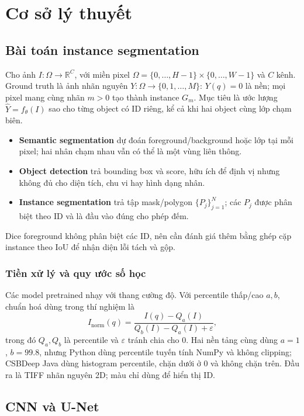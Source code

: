 \documentclass[12pt,a4paper]{report}
\begin{document}
\chapter{Cơ sở lý thuyết}
\section{Bài toán instance segmentation}
Cho ảnh $I:\Omega\rightarrow\mathbb{R}^C$, với miền pixel
$\Omega=\{0,\ldots,H-1\}\times\{0,\ldots,W-1\}$ và $C$ kênh. Ground truth
là ảnh nhãn nguyên $Y:\Omega\rightarrow\{0,1,\ldots,M\}$: $Y(q)=0$ là nền;
mọi pixel mang cùng nhãn $m>0$ tạo thành instance $G_m$. Mục tiêu là ước lượng
$\hat Y=f_\theta(I)$ sao cho từng object có ID riêng, kể cả khi hai object cùng
lớp chạm biên.

\begin{itemize}
\item \textbf{Semantic segmentation} dự đoán foreground/background hoặc lớp tại
mỗi pixel; hai nhân chạm nhau vẫn có thể là một vùng liên thông.
\item \textbf{Object detection} trả bounding box và score, hữu ích để định vị
nhưng không đủ cho diện tích, chu vi hay hình dạng nhân.
\item \textbf{Instance segmentation} trả tập mask/polygon $\{P_j\}_{j=1}^N$;
các $P_j$ được phân biệt theo ID và là đầu vào đúng cho phép đếm.
\end{itemize}

Dice foreground không phân biệt các ID, nên cần đánh giá thêm bằng ghép cặp
instance theo IoU để nhận diện lỗi tách và gộp.

\subsection{Tiền xử lý và quy ước số học}
Các model pretrained nhạy với thang cường độ. Với percentile thấp/cao $a,b$,
chuẩn hoá dùng trong thí nghiệm là
\begin{equation}
 I_{\mathrm{norm}}(q)=
 \frac{I(q)-Q_a(I)}{Q_b(I)-Q_a(I)+\varepsilon},
 \label{eq:percentile-normalization}
\end{equation}
trong đó $Q_a,Q_b$ là percentile và $\varepsilon$ tránh chia cho 0. Hai nền tảng
cùng dùng $a=1$, $b=99.8$, nhưng Python dùng percentile tuyến tính NumPy và
không clipping; CSBDeep Java dùng histogram percentile, chặn dưới ở 0 và không
chặn trên. Đầu ra là TIFF nhãn nguyên 2D; màu chỉ dùng để hiển thị ID.

\section{CNN và U-Net}
\end{document}
